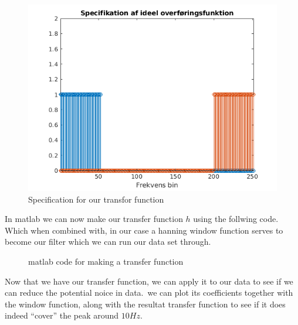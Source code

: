 \begin{figure}[h]
  \centering
  \includegraphics[scale = 0.5]{matlabStuff/Specification_of_transfer_function.png}
  \caption{Specification for our transfor function}%
  \label{fig:specificatiion}
\end{figure}

\newpage

In matlab we can now make our transfer function $h$ using the follwing code. Which when combined with, in our case a hanning window function serves to become our filter which we can run our
data set through.

\begin{figure}[h]
  \centering
  
  \caption{matlab code for making a transfer function}%
  \label{}
\end{figure}

Now that we have our transfer function, we can apply it to our data to see if we can reduce the potential noice in data.\
we can plot its coefficients together with the window function, along with the resultat transfer function to see if it
does indeed ``cover'' the peak around $10Hz$.

